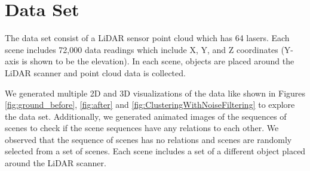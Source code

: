 \section{Data Set}
The data set consist of a LiDAR sensor point cloud which has 64 lasers. Each scene includes 72,000 data readings
which include X, Y, and Z coordinates (Y-axis is shown to be the elevation).
In each scene, objects are placed around the LiDAR scanner and point cloud data is collected.


We generated multiple 2D and 3D visualizations of the data like shown in Figures \ref{fig:ground_before},  \ref{fig:after}
and \ref{fig:ClusteringWithNoiseFiltering} to explore the data set.
Additionally, we generated animated images of the sequences of scenes to check if the scene sequences have any relations to each other.
We observed that the sequence of scenes has no relations and scenes are randomly selected from a set of scenes. Each scene includes a set of a different object placed around the LiDAR scanner.




%


